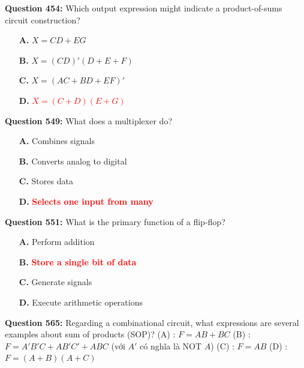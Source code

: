 \documentclass[12pt,a4paper]{article}
\begin{document}
\vspace{0.5cm}

\vspace{0.5cm}

\textbf{Question 454:} Which output expression might indicate a product-of-sums circuit construction?

\begin{itemize}
    \item[\textbf{A.}] $X = CD + EG$
    \item[\textbf{B.}] $X = (CD)'(D + E + F)$
    \item[\textbf{C.}] $X = (AC + BD + EF)'$
    \item[\textbf{D.}] \textcolor{red}{\textbf{$X = (C + D)(E + G)$}}
\end{itemize}

\vspace{0.5cm}

\vspace{0.5cm}



\textbf{Question 549:} What does a multiplexer do?

\begin{itemize}
    \item[\textbf{A.}] Combines signals
    \item[\textbf{B.}] Converts analog to digital
    \item[\textbf{C.}] Stores data
    \item[\textbf{D.}] \textcolor{red}{\textbf{Selects one input from many}}
\end{itemize}

\textbf{Question 551:} What is the primary function of a flip-flop?

\begin{itemize}
    \item[\textbf{A.}] Perform addition
    \item[\textbf{B.}] \textcolor{red}{\textbf{Store a single bit of data}}
    \item[\textbf{C.}] Generate signals
    \item[\textbf{D.}] Execute arithmetic operations
\end{itemize}

\textbf{Question 565:} Regarding a combinational circuit, what expressions are several examples about sum of products (SOP)?
(A) : \(F = AB + BC\)
(B) : \(F = A'B'C + AB'C' + ABC\) (với \(A'\) có nghĩa là NOT \(A\))
(C) : \(F = AB\)
(D) : \(F = (A + B)(A + C)\)
\end{document}
